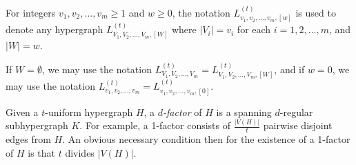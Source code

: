For integers $v_1, v_2, \ldots, v_m \geq 1$ and $w \geq 0$, the notation $L_{v_1, v_2, \ldots, v_m, [w]}^{(t)}$ is used to denote any hypergraph $L_{V_1, V_2, \ldots, V_m, [W]}^{(t)}$ where $|V_i| = v_i$ for each $i = 1, 2, \ldots, m$, and $|W| = w$.

If $W = \emptyset$, we may use the notation $L_{V_1, V_2, \ldots, V_m}^{(t)} = L_{V_1, V_2, \ldots, V_m, [W]}^{(t)}$, and if $w = 0$, we may use the notation $L_{v_1, v_2, \ldots, v_m}^{(t)} = L_{v_1, v_2, \ldots, v_m, [0]}^{(t)}$.


Given a $t$-uniform hypergraph $H$, a {\em $d$-factor} of $H$ is a spanning $d$-regular subhypergraph $K$.
For example, a
1-factor consists of $\frac{|V(H)|}{t}$ pairwise disjoint edges from $H$. An
obvious necessary condition then for the existence of a 1-factor of $H$ is that
$t$ divides $|V(H)|$.
